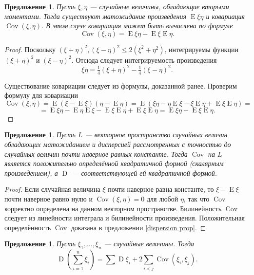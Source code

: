 \documentclass[12pt]{article}
\newtheorem{proposition}[theorem]{Предложение}
\numberwithin{theorem}{section}
\theoremstyle{definition}
\newcommand{\expect}{\operatorname{E}}
\newcommand{\disp}{\operatorname{D}}
\newcommand{\cov}{\operatorname{Cov}}
\begin{document}
	\begin{proposition}
		Пусть $ \xi, \eta $ --- случайные величины, обладающие вторыми моментами.
		Тогда существуют матожидание произведения $ \expect\xi\eta $ и ковариация $ \cov(\xi, \eta) $.
		В этом случе ковариация может быть вычислена по формуле
		$$ \cov(\xi, \eta) = \expect\xi\eta - \expect\xi\expect\eta. $$
	\end{proposition}
	
	\begin{proof}
		Поскольку $ (\xi + \eta)^2, (\xi - \eta)^2 \leqslant 2(\xi^2 + \eta^2) $,
		интегрируемы функции $ (\xi + \eta)^2 $ и $ (\xi - \eta)^2 $.
		Отсюда следует интегрируемость произведения
		$$ \xi\eta = \tfrac{1}{4}(\xi + \eta)^2 - \tfrac{1}{4}(\xi - \eta)^2. $$
		
		Существование ковариации следует из формулы, доказанной ранее.
		Проверим формулу для ковариации
		$$ \cov(\xi, \eta) = \expect(\xi - \expect\xi)(\eta - \expect\eta)
		= \expect(\xi\eta - \eta\expect\xi - \xi\expect\eta + \expect\xi\expect\eta) = $$ 
		$$ = \expect\xi\eta - \expect\eta\expect\xi - \expect\xi\expect\eta + \expect\xi\expect\eta
		= \expect\xi\eta - \expect\xi\expect\eta. $$
	\end{proof}
	
	\begin{proposition}
		Пусть $ L $ --- векторное пространство случайных величин обладающих матожиданием и дисперсией
		рассмотренных с точностью до случайных величин почти наверное равных константе.
		Тогда $ \cov $ на $ L $ является положительно определённой квадратичной формой (скалярным произведением),
		а $ \disp $ --- соответствующей ей квадратичной формой.
	\end{proposition}
	
	\begin{proof}
		Если случайная величина $ \xi $ почти наверное равна константе,
		то $ \xi - \expect\xi $ почти наверное равно нулю и $ \cov(\xi, \eta) = 0 $ для любой $ \eta $,
		так что $ \cov $ корректно определена на данном векторном пространстве.
		Билинейность $ \cov $ следует из линейности интеграла и билинейности произведения.
		Положительная определённость $ \cov $ доказана в предложении \ref{dispersion prop}.
	\end{proof}
	
	\begin{proposition}
		Пусть $ \xi_1, \ldots, \xi_n $ --- случайные величины. Тогда
		$$ \disp\left(\sum\limits_{i = 1}^{n} \xi_i\right) = \sum\limits \disp\xi_i + 2\sum\limits_{i < j}\cov(\xi_i,\xi_j). $$
	\end{proposition}
	
\end{document}
